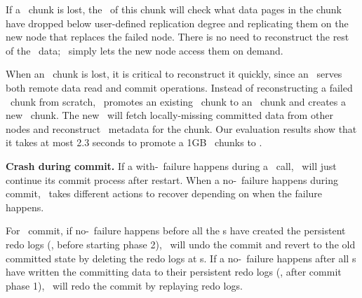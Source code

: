 If a \dn\ chunk is lost, 
the \on\ of this chunk will check what data pages in the chunk
have dropped below user-defined replication degree
and replicating them on the new node that replaces the failed node. 
There is no need to reconstruct the rest of the \dn\ data;
\hotpot\ simply lets the new node access them on demand.

When an \on\ chunk is lost, it is critical to reconstruct it quickly,
since an \on\ serves both remote data read and 
commit operations.
Instead of reconstructing a failed \on\ chunk from scratch,
\hotpot\ promotes an existing \dn\ chunk to an \on\ chunk
and creates a new \dn\ chunk.
The new \on\ will fetch locally-missing committed data from other nodes
and reconstruct \on\ metadata for the chunk.
Our evaluation results show that it takes at most 2.3 seconds to promote
a 1GB \dn\ chunks to \on.

{\bf Crash during commit.}
If a with-\nvm\ failure happens during a \commitxact\ call,
\hotpot\ will just continue its commit process after restart.
When a no-\nvm\ failure happens during commit,
\hotpot\ takes different actions to recover depending on when the failure happens.

For \mrmw\ commit, if no-\nvm\ failure happens before all the \on{}s have created the persistent redo logs (\ie, before starting phase 2),
\hotpot\ will undo the commit and revert to the old committed state
by deleting the redo logs at \on{}s.
If a no-\nvm\ failure happens after all \on{}s have written the committing data to their persistent redo logs (\ie, after commit phase 1),
\hotpot\ will redo the commit by replaying redo logs.

